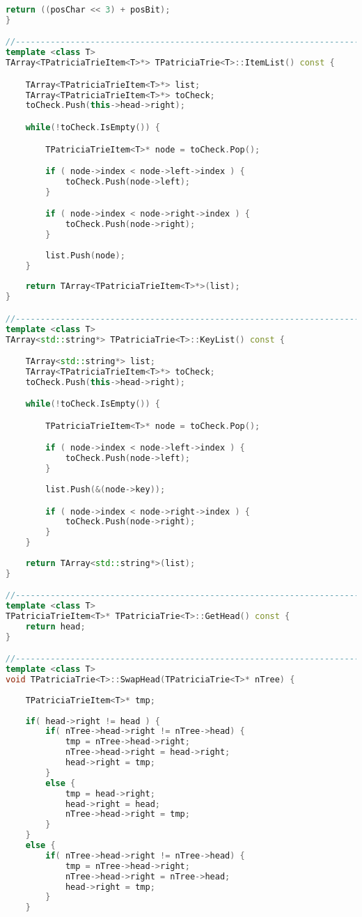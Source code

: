 \begin{lstlisting}[language=C++]
    return ((posChar << 3) + posBit);
}

//----------------------------------------------------------------------------
template <class T>
TArray<TPatriciaTrieItem<T>*> TPatriciaTrie<T>::ItemList() const {

    TArray<TPatriciaTrieItem<T>*> list;
    TArray<TPatriciaTrieItem<T>*> toCheck;
    toCheck.Push(this->head->right);

    while(!toCheck.IsEmpty()) {

        TPatriciaTrieItem<T>* node = toCheck.Pop();

        if ( node->index < node->left->index ) {
            toCheck.Push(node->left);
        }

        if ( node->index < node->right->index ) {
            toCheck.Push(node->right);
        }
        
        list.Push(node);
    }
    
    return TArray<TPatriciaTrieItem<T>*>(list);
}

//----------------------------------------------------------------------------
template <class T>
TArray<std::string*> TPatriciaTrie<T>::KeyList() const {

    TArray<std::string*> list;
    TArray<TPatriciaTrieItem<T>*> toCheck;
    toCheck.Push(this->head->right);

    while(!toCheck.IsEmpty()) {

        TPatriciaTrieItem<T>* node = toCheck.Pop();

        if ( node->index < node->left->index ) {
            toCheck.Push(node->left);
        }
        
        list.Push(&(node->key));

        if ( node->index < node->right->index ) {
            toCheck.Push(node->right);
        }
    }
    
    return TArray<std::string*>(list);
}

//----------------------------------------------------------------------------
template <class T>
TPatriciaTrieItem<T>* TPatriciaTrie<T>::GetHead() const {
    return head;
}

//----------------------------------------------------------------------------
template <class T>
void TPatriciaTrie<T>::SwapHead(TPatriciaTrie<T>* nTree) {
    
    TPatriciaTrieItem<T>* tmp;
    
    if( head->right != head ) {
        if( nTree->head->right != nTree->head) {
            tmp = nTree->head->right;
            nTree->head->right = head->right;
            head->right = tmp;
        }
        else {
            tmp = head->right;
            head->right = head;
            nTree->head->right = tmp;
        }
    }
    else {
        if( nTree->head->right != nTree->head) {
            tmp = nTree->head->right;
            nTree->head->right = nTree->head;
            head->right = tmp;
        }
    }
    

\end{lstlisting}

